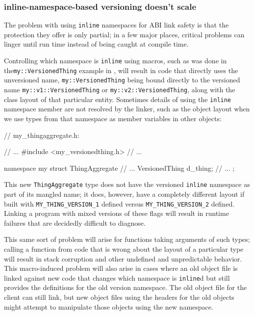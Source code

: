 \subsubsection[\lstinline!nline!-namespace-based versioning doesn’t scale]{{\SubsubsecCode inline}-namespace-based versioning doesn’t scale}\label{inline-namespace-based-versioning-doesn’t-scale}

The problem with using \lstinline!inline! namespaces for ABI link safety is
that the protection they offer is only partial; in a few major places,
critical problems can linger until run time instead of being caught at
compile time.

Controlling which namespace is \lstinline!inline! using macros, such as was
done in the\linebreak[4] \lstinline!my::VersionedThing! example in ,
will result in code that
directly uses the unversioned name, \lstinline!my::VersionedThing! being
bound directly to the versioned name \lstinline!my::v1::VersionedThing! or
\lstinline!my::v2::VersionedThing!, along with the class layout of that
particular entity. Sometimes details of using the \lstinline!inline!
namespace member are not resolved by the linker, such as the object
layout when we use types from that namespace as member variables in
other objects:

\begin{emcppslisting}[emcppsbatch=e7]
// my_thingaggregate.h:

// ...
#include <my_versionedthing.h>
// ...

namespace my
{
    struct ThingAggregate
    {
        // ...
        VersionedThing d_thing;
        // ...
    };
}
\end{emcppslisting}

\noindent This new \lstinline!ThingAggregate! type does not have the versioned
\lstinline!inline! namespace as part of its mangled name; it does, however,
have a completely different layout if built with
\lstinline!MY_THING_VERSION_1! defined
versus \lstinline!MY_THING_VERSION_2! defined. Linking a program with mixed
versions of these flags will result in runtime failures that are
decidedly difficult to diagnose.

This same sort of problem will arise for functions taking arguments of
such types; calling a function from code that is wrong about the layout
of a particular type will result in stack corruption and other undefined
and unpredictable behavior. This macro-induced problem will also arise in cases where an old object
file is linked against new code that changes which namespace is
\lstinline!inline!d but still provides the definitions for the old version
namespace. The old object file for the client can still link, but new
object files using the headers for the old objects might attempt to
manipulate those objects using the new namespace.

